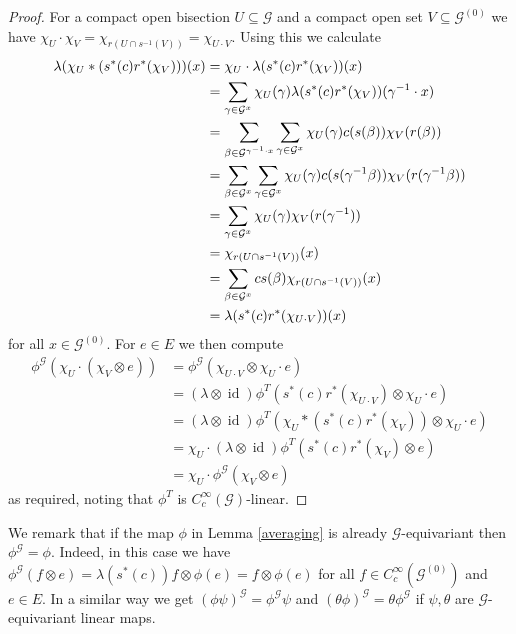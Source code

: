 \documentclass{amsart}
\newcommand{\G}{\mathcal{G}}
\newcommand{\ccinfty}{C_c^\infty}
\DeclareMathOperator{\id}{id}
\begin{document}
\begin{proof}
For a compact open bisection $ U \subseteq \G $ and a compact open set $ V \subseteq \G^{(0)} $ we have $ \chi_U \cdot \chi_V = \chi_{r(U \cap s^{-1}(V))} = \chi_{U \cdot V} $. 
Using this we calculate
\begin{align*}
\lambda(\chi_U * (s^*(c) r^*(\chi_V)))(x) &= \chi_U \cdot \lambda(s^*(c) r^*(\chi_V))(x) \\
&= \sum_{\gamma \in \G^x} \chi_U(\gamma) \lambda(s^*(c) r^*(\chi_V))(\gamma^{-1} \cdot x) \\
&= \sum_{\beta \in \G^{\gamma^{-1} \cdot x}} \sum_{\gamma \in \G^x} \chi_U(\gamma) c(s(\beta)) \chi_V(r(\beta)) \\
&= \sum_{\beta \in \G^x} \sum_{\gamma \in \G^x} \chi_U(\gamma) c(s(\gamma^{-1}\beta)) \chi_V(r(\gamma^{-1}\beta)) \\
&= \sum_{\gamma \in \G^x} \chi_U(\gamma) \chi_V(r(\gamma^{-1})) \allowdisplaybreaks[2] \\
&= \chi_{r(U \cap s^{-1}(V))}(x) \\
&= \sum_{\beta \in \G^x} cs(\beta) \chi_{r(U \cap s^{-1}(V))}(x) \\
&= \lambda(s^*(c) r^*(\chi_{U \cdot V}))(x)
\end{align*}
for all $ x \in \G^{(0)} $. For $ e \in E $ we then compute 
\begin{align*}
\phi^\G(\chi_U \cdot (\chi_V \otimes e)) &= \phi^\G(\chi_{U \cdot V} \otimes \chi_U \cdot e) \\ 
&= (\lambda \otimes \id) \phi^T(s^*(c) r^*(\chi_{U \cdot V}) \otimes \chi_U \cdot e) \\
&= (\lambda \otimes \id) \phi^T(\chi_U * (s^*(c) r^*(\chi_V)) \otimes \chi_U \cdot e) \\
&= \chi_U \cdot (\lambda \otimes \id) \phi^T(s^*(c) r^*(\chi_V) \otimes e) \\
&= \chi_U \cdot \phi^\G(\chi_V \otimes e)
\end{align*}
as required, noting that $ \phi^T $ is $ \ccinfty(\G) $-linear. 
\end{proof}

We remark that if the map $ \phi $ in Lemma \ref{averaging} is already $ \G $-equivariant then $ \phi^\G = \phi $. Indeed, in this case we have $ \phi^\G(f \otimes e) = \lambda(s^*(c)) f \otimes \phi(e) = f \otimes \phi(e) $ for all $ f \in \ccinfty(\G^{(0)}) $ and $ e \in E $. In a similar way we get $ (\phi \psi)^\G = \phi^\G \psi $ and $ (\theta \phi)^\G = \theta \phi^\G $ if $ \psi, \theta $ are $ \G $-equivariant linear maps. 
\end{document}
